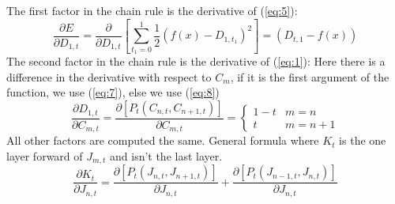 \documentclass{article}
\begin{document}
The first factor in the chain rule is the derivative of (\ref{eq:5}):
\begin{equation}
    \frac{\partial E}{\partial D_{1, t}} = \frac{\partial}{\partial D_{1, t}}\left[\sum_{t_1=0}^1\frac{1}{2}(f(x) - D_{1,t_1})^2\right] = (D_{t,1} - f(x))
\end{equation}
The second factor in the chain rule is the derivative of (\ref{eq:1}):
Here there is a difference in the derivative with respect to $ C_m $, if it is the first argument of the function, we use (\ref{eq:7}), else we use (\ref{eq:8})
\begin{equation}
    \frac{\partial D_{1, t}}{\partial C_{m, t}} = \frac{\partial \left[P_t(C_{n, t}, C_{n+1, t})\right]}{\partial C_{m, t}} = \begin{cases} 
      1 - t & m = n \\
      t & m = n+1
   \end{cases}
\end{equation}
All other factors are computed the same.
General formula where $ K_{t} $ is the one layer forward of $J_{m,t}$ and isn't the last layer.
\begin{equation}
	\frac{\partial K_{t}}{\partial J_{n,t}} = \frac{\partial \left[P_t(J_{n, t}, J_{n+1, t})\right]}{\partial J_{n, t}} + \frac{\partial \left[P_t(J_{n-1, t}, J_{n, t})\right]}{\partial J_{n, t}}
\end{equation}
\end{document}
